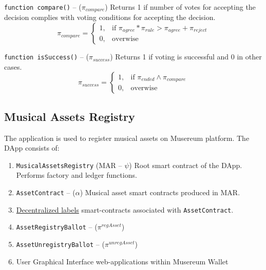 \documentclass[12pt]{report}
\def\code#1{\colorbox{light-gray}{\texttt{#1}}}
\begin{document}
\begin{multicols}{2}
\code{function compare()} – ($\pi_{compare}$)\hfill\null\linebreak
Returns 1 if number of votes for accepting the decision complies with voting conditions for accepting the decision.
\begin{equation}
\pi_{compare} = \begin{cases}
	1, & \text{if }\pi_{agree} * \pi_{rule} > \pi_{agree} + \pi_{reject} \\
	0, & \text{overwise}
\end{cases}
\end{equation}

\code{function isSuccess()} – ($\pi_{success}$)\hfill\null\linebreak
Returns 1 if voting is successful and 0 in other cases.
\begin{equation}
\pi_{success} = \begin{cases}
	1, & \text{if } \pi_{ended} \wedge \pi_{compare} \\
	0, & \text{overwise }
\end{cases}
\end{equation}
\end{multicols}
\subsection{Musical Assets Registry}
\label{tech-apps-assets}
\begin{multicols}{2}
The application is used to register musical assets on Musereum platform. The DApp consists of:
\begin{enumerate}
	\item \code{MusicalAssetsRegistry} (MAR – $\psi$)\hfill\null\linebreak
	Root	smart contract of the DApp. Performs factory and ledger functions.
	\item \code{AssetContract} – ($\alpha$)\hfill\null\linebreak
	Musical asset smart contracts produced in MAR.
	\item \hyperref[tech-apps-dal]{Decentralized labels} smart-contracts associated with \code{AssetContract}.
	\item \code{AssetRegistryBallot} – ($\pi^{regAsset}$)
	\item \code{AssetUnregistryBallot} – ($\pi^{unregAsset}$)
	\item User Graphical Interface \hfill\null\linebreak
	web-applications within Musereum Wallet
\end{enumerate}
\end{multicols}
\end{document}
